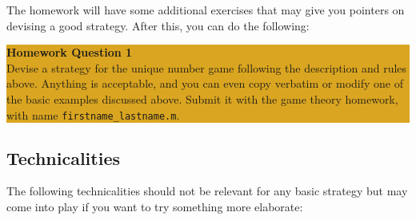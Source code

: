 \documentclass[12pt]{amsart}
\begin{document}
\noindent The homework will have some additional exercises that may give you pointers on
devising a good strategy. After this, you can do the following: 


\bigskip
\begin{center}
\colorbox{Goldenrod}{\parbox{15cm}{
{
\textbf{\large Homework Question 1}\vspace{1mm} \\
Devise a strategy for the unique number game following the description and
rules above. Anything is acceptable, and you can even copy verbatim or modify
one of the basic examples discussed above. Submit it with the game theory
homework, with name \texttt{firstname\_lastname.m}.}}}
\end{center}
\bigskip

\subsection{Technicalities}
The following technicalities should not be relevant for any basic strategy but
may come into play if you want to try something more elaborate:\\
\end{document}
